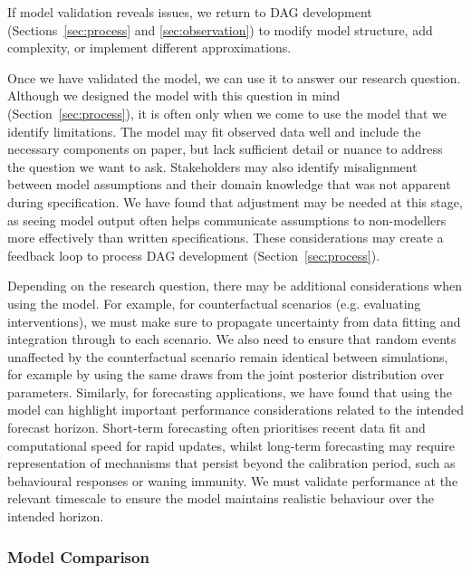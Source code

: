 \documentclass{article}
\begin{document}
If model validation reveals issues, we return to \ac{DAG} development (Sections~\ref{sec:process} and \ref{sec:observation}) to modify model structure, add complexity, or implement different approximations.

Once we have validated the model, we can use it to answer our research question.
Although we designed the model with this question in mind (Section~\ref{sec:process}), it is often only when we come to use the model that we identify limitations.
The model may fit observed data well and include the necessary components on paper, but lack sufficient detail or nuance to address the question we want to ask.
Stakeholders may also identify misalignment between model assumptions and their domain knowledge that was not apparent during specification.
We have found that adjustment may be needed at this stage, as seeing model output often helps communicate assumptions to non-modellers more effectively than written specifications.
These considerations may create a feedback loop to process \ac{DAG} development (Section~\ref{sec:process}).

Depending on the research question, there may be additional considerations when using the model.
For example, for counterfactual scenarios (e.g. evaluating interventions), we must make sure to propagate uncertainty from data fitting and integration through to each scenario.
We also need to ensure that random events unaffected by the counterfactual scenario remain identical between simulations, for example by using the same draws from the joint posterior distribution over parameters.
Similarly, for forecasting applications, we have found that using the model can highlight important performance considerations related to the intended forecast horizon.
Short-term forecasting often prioritises recent data fit and computational speed for rapid updates, whilst long-term forecasting may require representation of mechanisms that persist beyond the calibration period, such as behavioural responses or waning immunity.
We must validate performance at the relevant timescale to ensure the model maintains realistic behaviour over the intended horizon.

\subsubsection{Model Comparison}
\end{document}
